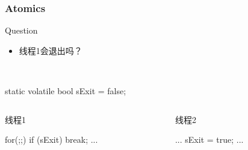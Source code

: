 \documentclass[UTF8,lualatex]{ctexbeamer}
\begin{document}
\begin{frame}[fragile,t]
    \frametitle{Atomics}
    \begin{alertblock}{Question}
        \begin{itemize}
            \item 线程1会退出吗？
        \end{itemize}
    \end{alertblock}
    \begin{exampleblock}{~}
        \begin{cppcode}
            static volatile bool sExit = false;
        \end{cppcode}
    \end{exampleblock}
    \begin{columns}[t]
        \begin{column}{.45\textwidth}
            \begin{exampleblock}{线程1}
                \begin{cppcode}
                    for(;;) {
                        if (sExit) break;
                        ...
                    }
                \end{cppcode}
            \end{exampleblock}
        \end{column}
        \begin{column}{.45\textwidth}
            \begin{exampleblock}{线程2}
                \begin{cppcode}
                    ...
                    sExit = true;
                    ...
                \end{cppcode}
            \end{exampleblock}
        \end{column}
    \end{columns}
\end{frame}

\end{document}
